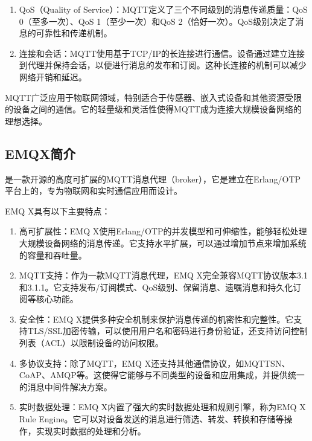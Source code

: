\documentclass[a4paper,12pt,english]{sphinxmanual}
\begin{document}
{{\begin{enumerate}
\item {} 
\sphinxAtStartPar
QoS（Quality of Service）：MQTT定义了三个不同级别的消息传递质量：QoS 0（至多一次）、QoS 1（至少一次）和QoS 2（恰好一次）。QoS级别决定了消息的可靠性和传递机制。

\item {} 
\sphinxAtStartPar
连接和会话：MQTT使用基于TCP/IP的长连接进行通信。设备通过建立连接到代理并保持会话，以便进行消息的发布和订阅。这种长连接的机制可以减少网络开销和延迟。

\end{enumerate}

\sphinxAtStartPar
MQTT广泛应用于物联网领域，特别适合于传感器、嵌入式设备和其他资源受限的设备之间的通信。它的轻量级和灵活性使得MQTT成为连接大规模设备网络的理想选择。


\subsection{EMQX简介}
\label{\detokenize{exp-esp32/mqtt:emqx}}
\sphinxAtStartPar
{}是一款开源的高度可扩展的MQTT消息代理（broker），它是建立在Erlang/OTP平台上的，专为物联网和实时通信应用而设计。

\sphinxAtStartPar
EMQ X具有以下主要特点：
\begin{enumerate}
%
\item {} 
\sphinxAtStartPar
高可扩展性：EMQ X使用Erlang/OTP的并发模型和可伸缩性，能够轻松处理大规模设备网络的消息传递。它支持水平扩展，可以通过增加节点来增加系统的容量和吞吐量。

\item {} 
\sphinxAtStartPar
MQTT支持：作为一款MQTT消息代理，EMQ X完全兼容MQTT协议版本3.1和3.1.1。它支持发布/订阅模式、QoS级别、保留消息、遗嘱消息和持久化订阅等核心功能。

\item {} 
\sphinxAtStartPar
安全性：EMQ X提供多种安全机制来保护消息传递的机密性和完整性。它支持TLS/SSL加密传输，可以使用用户名和密码进行身份验证，还支持访问控制列表（ACL）以限制设备的访问权限。

\item {} 
\sphinxAtStartPar
多协议支持：除了MQTT，EMQ X还支持其他通信协议，如MQTT\sphinxhyphen{}SN、CoAP、AMQP等。这使得它能够与不同类型的设备和应用集成，并提供统一的消息中间件解决方案。

\item {} 
\sphinxAtStartPar
实时数据处理：EMQ X内置了强大的实时数据处理和规则引擎，称为EMQ X Rule Engine。它可以对设备发送的消息进行筛选、转发、转换和存储等操作，实现实时数据的处理和分析。


\end{enumerate}}}
\end{document}
